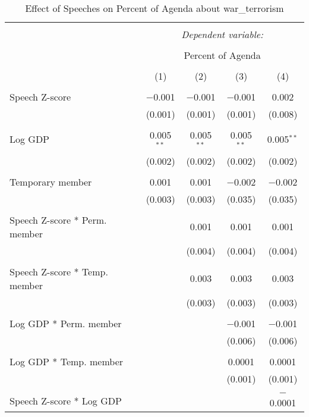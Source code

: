 
\begin{table}[!htbp] \centering 
  \caption{Effect of Speeches on Percent of Agenda about war_terrorism} 
  \label{} 
\begin{tabular}{@{\extracolsep{5pt}}lcccc} 
\\[-1.8ex]\hline 
\hline \\[-1.8ex] 
 & \multicolumn{4}{c}{\textit{Dependent variable:}} \\ 
\cline{2-5} 
\\[-1.8ex] & \multicolumn{4}{c}{Percent of Agenda} \\ 
\\[-1.8ex] & (1) & (2) & (3) & (4)\\ 
\hline \\[-1.8ex] 
 Speech Z-score & $-$0.001 & $-$0.001 & $-$0.001 & 0.002 \\ 
  & (0.001) & (0.001) & (0.001) & (0.008) \\ 
  & & & & \\ 
 Log GDP & 0.005$^{**}$ & 0.005$^{**}$ & 0.005$^{**}$ & 0.005$^{**}$ \\ 
  & (0.002) & (0.002) & (0.002) & (0.002) \\ 
  & & & & \\ 
 Temporary member & 0.001 & 0.001 & $-$0.002 & $-$0.002 \\ 
  & (0.003) & (0.003) & (0.035) & (0.035) \\ 
  & & & & \\ 
 Speech Z-score * Perm. member &  & 0.001 & 0.001 & 0.001 \\ 
  &  & (0.004) & (0.004) & (0.004) \\ 
  & & & & \\ 
 Speech Z-score * Temp. member &  & 0.003 & 0.003 & 0.003 \\ 
  &  & (0.003) & (0.003) & (0.003) \\ 
  & & & & \\ 
 Log GDP * Perm. member &  &  & $-$0.001 & $-$0.001 \\ 
  &  &  & (0.006) & (0.006) \\ 
  & & & & \\ 
 Log GDP * Temp. member &  &  & 0.0001 & 0.0001 \\ 
  &  &  & (0.001) & (0.001) \\ 
  & & & & \\ 
 Speech Z-score * Log GDP &  &  &  & $-$0.0001 \\ 

\end{tabular}
\end{table}
